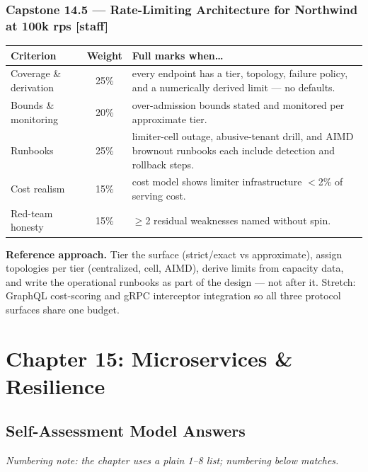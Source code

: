 \subsubsection*{Capstone 14.5 --- Rate-Limiting Architecture for Northwind at 100k rps [staff]}
\begin{center}\small
\begin{tabularx}{\textwidth}{l c X}
\toprule
\textbf{Criterion} & \textbf{Weight} & \textbf{Full marks when\ldots} \\
\midrule
Coverage \& derivation & 25\% & every endpoint has a tier, topology, failure policy, and a numerically derived limit --- no defaults. \\
Bounds \& monitoring & 20\% & over-admission bounds stated and monitored per approximate tier. \\
Runbooks & 25\% & limiter-cell outage, abusive-tenant drill, and AIMD brownout runbooks each include detection and rollback steps. \\
Cost realism & 15\% & cost model shows limiter infrastructure $<$2\% of serving cost. \\
Red-team honesty & 15\% & $\geq$2 residual weaknesses named without spin. \\
\bottomrule
\end{tabularx}
\end{center}
\textbf{Reference approach.} Tier the surface (strict/exact vs
approximate), assign topologies per tier (centralized, cell, AIMD),
derive limits from capacity data, and write the operational runbooks as
part of the design --- not after it. Stretch: GraphQL cost-scoring and gRPC
interceptor integration so all three protocol surfaces share one budget.

\section{Chapter 15: Microservices \& Resilience}
\label{sec:sol-ch15}

\subsection{Self-Assessment Model Answers}

\emph{Numbering note: the chapter uses a plain 1--8 list; numbering below
matches.}

